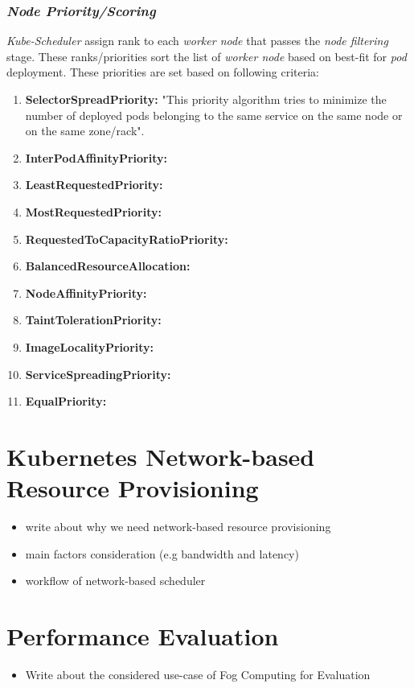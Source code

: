 \subsubsection{\emph{Node Priority/Scoring}}
\label{sec:node-priority}
\emph{Kube-Scheduler} assign rank to each \emph{worker node} that passes the \emph{node filtering} stage. These ranks/priorities sort the list of \emph{worker node} based on best-fit for \emph{pod} deployment. These priorities are set based on following criteria\cite{k8s}:
\begin{enumerate}
  \item \textbf{SelectorSpreadPriority:} "This priority algorithm tries to minimize the number of deployed pods belonging to the same service on the same node or on the same zone/rack"\cite{Santos2019}.
  \item \textbf{InterPodAffinityPriority:} 
  \item \textbf{LeastRequestedPriority:}
  \item \textbf{MostRequestedPriority:}
  \item \textbf{RequestedToCapacityRatioPriority:}
  \item \textbf{BalancedResourceAllocation:}
  \item \textbf{NodeAffinityPriority:}
  \item \textbf{TaintTolerationPriority:}
  \item \textbf{ImageLocalityPriority:}
  \item \textbf{ServiceSpreadingPriority:}
  \item \textbf{EqualPriority:}
\end{enumerate}
\section{Kubernetes Network-based Resource Provisioning}
\label{sec: k8s_ns}
\begin{itemize}
  \item write about why we need network-based resource provisioning
  \item main factors consideration (e.g bandwidth and latency)
  \item workflow of network-based scheduler
\end{itemize}

\section{Performance Evaluation}
\label{sec:Performance_eval}
\begin{itemize}
  \item Write about the considered use-case of Fog Computing for Evaluation
\end{itemize}
